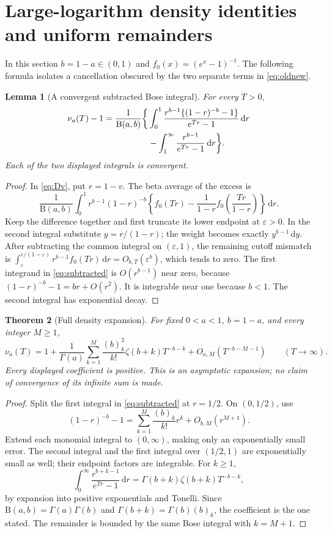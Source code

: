\documentclass[11pt]{article}
\numberwithin{equation}{section}
\newtheorem{theorem}{Theorem}[section]
\newtheorem{lemma}[theorem]{Lemma}
\theoremstyle{definition}\newtheorem{definition}[theorem]{Definition}
\theoremstyle{remark}\newtheorem{remark}[theorem]{Remark}
\newcommand{\dd}{\,\mathrm d}
\newcommand{\BB}{\mathrm B}
\begin{document}
\section{Large-logarithm density identities and uniform remainders}
\label{sec:largeT}
In this section $b=1-a\in(0,1)$ and $f_0(x)=(e^x-1)^{-1}$.
The following formula isolates a cancellation obscured by the two
separate terms in \eqref{eq:oldnew}.

\begin{lemma}[A convergent subtracted Bose integral]\label{lem:subtracted}
For every $T>0$,
\begin{align}\label{eq:subtracted}
 \nu_a(T)-1=\frac1{\BB(a,b)}\bigg\{&
 \int_0^1\frac{r^{b-1}\{(1-r)^{-b}-1\}}{e^{Tr}-1}\dd r\notag\\
 &-\int_1^\infty\frac{r^{b-1}}{e^{Tr}-1}\dd r\bigg\}.
\end{align}
Each of the two displayed integrals is convergent.
\end{lemma}
\begin{proof}
In \eqref{eq:Dv}, put $r=1-v$. The beta average of the excess is
\[
 \frac1{\BB(a,b)}\int_0^1r^{b-1}(1-r)^{-b}
 \left\{f_0(Tr)-\frac1{1-r}f_0\left(\frac{Tr}{1-r}\right)\right\}\dd r.
\]
Keep the difference together and first truncate its lower endpoint
at $\varepsilon>0$. In the second integral substitute
$y=r/(1-r)$; the weight becomes exactly $y^{b-1}\dd y$.
After subtracting the common integral on $(\varepsilon,1)$, the
remaining cutoff mismatch is
$\int_\varepsilon^{\varepsilon/(1-\varepsilon)}
r^{b-1}f_0(Tr)\dd r=O_{b,T}(\varepsilon^b)$, which tends to zero.
The first integrand in \eqref{eq:subtracted} is $O(r^{b-1})$ near
zero, because $(1-r)^{-b}-1=br+O(r^2)$. It is integrable near one
because $b<1$. The second integral has exponential decay.
\end{proof}

\begin{theorem}[Full density expansion]\label{thm:densityasympt}
For fixed $0<a<1$, $b=1-a$, and every integer $M\ge1$,
\begin{equation}\label{eq:densityasympt}
 \nu_a(T)=1+\frac1{\Gamma(a)}
 \sum_{k=1}^M\frac{(b)_k^2}{k!}\zeta(b+k)T^{-b-k}
 +O_{a,M}(T^{-b-M-1})\qquad(T\to\infty).
\end{equation}
Every displayed coefficient is positive. This is an asymptotic
expansion; no claim of convergence of its infinite sum is made.
\end{theorem}
\begin{proof}
Split the first integral in \eqref{eq:subtracted} at $r=1/2$.
On $(0,1/2)$, use
\[
 (1-r)^{-b}-1=\sum_{k=1}^M\frac{(b)_k}{k!}r^k+O_{b,M}(r^{M+1}).
\]
Extend each monomial integral to $(0,\infty)$, making only an
exponentially small error. The second integral and the first
integral over $(1/2,1)$ are exponentially small as well; their
endpoint factors are integrable. For $k\ge1$,
\[
 \int_0^\infty\frac{r^{b+k-1}}{e^{Tr}-1}\dd r
 =\Gamma(b+k)\zeta(b+k)T^{-b-k},
\]
by expansion into positive exponentials and Tonelli. Since
$\BB(a,b)=\Gamma(a)\Gamma(b)$ and
$\Gamma(b+k)=\Gamma(b)(b)_k$, the coefficient is the one stated.
The remainder is bounded by the same Bose integral with $k=M+1$.
\end{proof}
\end{document}
